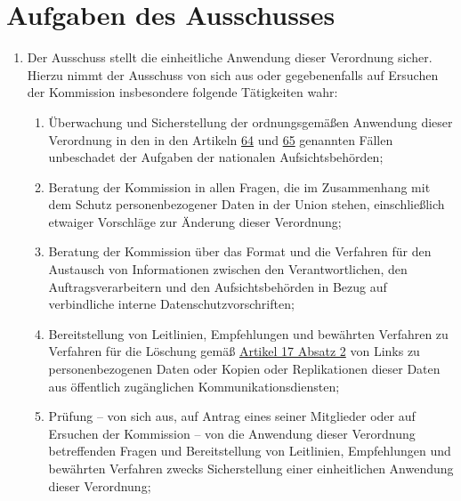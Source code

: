\chapter{Aufgaben des Ausschusses}
\label{ch:70}


\begin{enumerate}

  \item Der Ausschuss stellt die einheitliche Anwendung dieser Verordnung sicher. Hierzu nimmt der Ausschuss von sich
   aus oder gegebenenfalls auf Ersuchen der Kommission insbesondere folgende Tätigkeiten wahr:
  \label{itm:70-1}

  \begin{enumerate}
  
    \item Überwachung und Sicherstellung der ordnungsgemäßen Anwendung dieser Verordnung in den in den Artikeln
     \hyperref[ch:64]{64} und \hyperref[ch:65]{65} genannten Fällen unbeschadet der Aufgaben der nationalen
      Aufsichtsbehörden;
    \label{itm:70-1a}

    \item Beratung der Kommission in allen Fragen, die im Zusammenhang mit dem Schutz personenbezogener Daten in der
     Union stehen, einschließlich etwaiger Vorschläge zur Änderung dieser Verordnung;
    \label{itm:70-1b}

    \item Beratung der Kommission über das Format und die Verfahren für den Austausch von Informationen zwischen den
     Verantwortlichen, den Auftragsverarbeitern und den Aufsichtsbehörden in Bezug auf verbindliche interne
     Datenschutzvorschriften;
    \label{itm:70-1c}

    \item Bereitstellung von Leitlinien, Empfehlungen und bewährten Verfahren zu Verfahren für die Löschung gemäß
     \hyperref[itm:17-2]{Artikel 17 Absatz 2} von Links zu personenbezogenen Daten oder Kopien oder Replikationen dieser
     Daten aus öffentlich zugänglichen Kommunikationsdiensten;
    \label{itm:70-1d}

    \item Prüfung -- von sich aus, auf Antrag eines seiner Mitglieder oder auf Ersuchen der Kommission -- von die
     Anwendung dieser Verordnung betreffenden Fragen und Bereitstellung von Leitlinien, Empfehlungen und bewährten
     Verfahren zwecks Sicherstellung einer einheitlichen Anwendung dieser Verordnung;
    \label{itm:70-1e}


\end{enumerate}
\end{enumerate}
